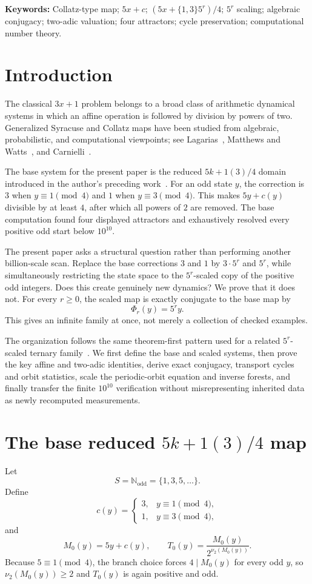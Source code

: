 \documentclass[11pt]{article}
\newcommand{\vTwo}{\nu_2}
\newcommand{\Odd}{\mathbb N_{\mathrm{odd}}}
\begin{document}
\noindent\textbf{Keywords:} Collatz-type map; $5x+c$; $(5x+\{1,3\}5^r)/4$; $5^r$ scaling; algebraic conjugacy; two-adic valuation; four attractors; cycle preservation; computational number theory.

\section{Introduction}
The classical $3x+1$ problem belongs to a broad class of arithmetic dynamical systems in which an affine operation is followed by division by powers of two. Generalized Syracuse and Collatz maps have been studied from algebraic, probabilistic, and computational viewpoints; see Lagarias~\cite{Lagarias1985}, Matthews and Watts~\cite{MatthewsWatts1985}, and Carnielli~\cite{Carnielli2015}.

The base system for the present paper is the reduced $5k+1(3)/4$ domain introduced in the author's preceding work~\cite{BanazadehBase}. For an odd state $y$, the correction is $3$ when $y\equiv1\pmod4$ and $1$ when $y\equiv3\pmod4$. This makes $5y+c(y)$ divisible by at least $4$, after which all powers of $2$ are removed. The base computation found four displayed attractors and exhaustively resolved every positive odd start below $10^{10}$.

The present paper asks a structural question rather than performing another billion-scale scan. Replace the base corrections $3$ and $1$ by $3\cdot5^r$ and $5^r$, while simultaneously restricting the state space to the $5^r$-scaled copy of the positive odd integers. Does this create genuinely new dynamics? We prove that it does not. For every $r\ge0$, the scaled map is exactly conjugate to the base map by
\[
\Phi_r(y)=5^r y.
\]
This gives an infinite family at once, not merely a collection of checked examples.

The organization follows the same theorem-first pattern used for a related $5^r$-scaled ternary family~\cite{BanazadehScaledPM}. We first define the base and scaled systems, then prove the key affine and two-adic identities, derive exact conjugacy, transport cycles and orbit statistics, scale the periodic-orbit equation and inverse forests, and finally transfer the finite $10^{10}$ verification without misrepresenting inherited data as newly recomputed measurements.

\section{The base reduced $5k+1(3)/4$ map}
Let
\[
S=\Odd=\{1,3,5,\ldots\}.
\]
Define
\[
c(y)=\begin{cases}
3,&y\equiv1\pmod4,\\
1,&y\equiv3\pmod4,
\end{cases}
\]
and
\begin{equation}
M_0(y)=5y+c(y),\qquad
T_0(y)=\frac{M_0(y)}{2^{\vTwo(M_0(y))}}.
\label{eq:base}
\end{equation}
Because $5\equiv1\pmod4$, the branch choice forces $4\mid M_0(y)$ for every odd $y$, so $\vTwo(M_0(y))\ge2$ and $T_0(y)$ is again positive and odd.
\end{document}
